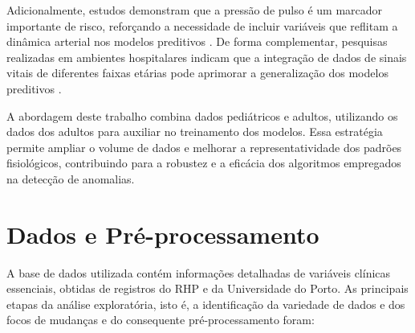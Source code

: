 \documentclass[conference]{IEEEtran}
\begin{document}
Adicionalmente, estudos demonstram que a pressão de pulso é um marcador importante de risco, reforçando a necessidade de incluir variáveis que reflitam a dinâmica arterial nos modelos preditivos \cite{ref:Vasan2002}. De forma complementar, pesquisas realizadas em ambientes hospitalares indicam que a integração de dados de sinais vitais de diferentes faixas etárias pode aprimorar a generalização dos modelos preditivos \cite{ref:Islam2024}.

A abordagem deste trabalho combina dados pediátricos e adultos, utilizando os dados dos adultos para auxiliar no treinamento dos modelos. Essa estratégia permite ampliar o volume de dados e melhorar a representatividade dos padrões fisiológicos, contribuindo para a robustez e a eficácia dos algoritmos empregados na detecção de anomalias.


\section{Dados e Pré-processamento}
A base de dados utilizada contém informações detalhadas de variáveis clínicas essenciais, obtidas de registros do RHP e da Universidade do Porto. As principais etapas da análise exploratória, isto é, a identificação da variedade de dados e dos focos de mudanças e do consequente pré-processamento foram:
\end{document}
